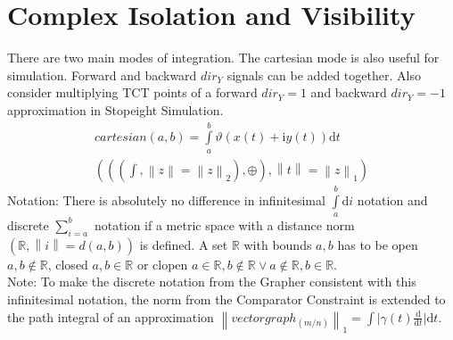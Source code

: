 \documentclass{report}
\newcommand\norm[1]{\left\lVert#1\right\rVert}
\begin{document}
\section{Complex Isolation and Visibility}
There are two main modes of integration. The cartesian mode is also useful for simulation. Forward and backward $dir_{Y}$ signals can be added together. Also consider multiplying TCT points of a forward $dir_{Y}=1$ and backward $dir_{Y}=-1$ approximation in Stopeight Simulation.
\begin{align}
cartesian(a,b)=\int \limits _{a}^{b} \vartheta (x(t)+\mathrm{i}y(t)) \mathrm{d} t\\
(((\int,\norm{z}=\norm{z}_2),\oplus),\norm{t}=\norm{z}_1)
\end{align}
Notation: There is absolutely no difference in infinitesimal $\int \limits _{a}^{b} \mathrm{d}i$ notation and discrete $\sum  \limits _{i=a}^{b}$ notation if a metric space with a distance norm $(\mathbb{R},\norm{i}=d(a,b))$ is defined. A set $\mathbb{R}$ with bounds $a,b$ has to be open $a,b \not \in \mathbb{R}$, closed $a,b \in \mathbb{R}$ or clopen $a \in \mathbb{R}, b \not \in \mathbb{R} \lor a \not \in \mathbb{R},b \in \mathbb{R}$.\\
Note: To make the discrete notation from the Grapher consistent with this infinitesimal notation, the norm from the Comparator Constraint is extended to the path integral of an approximation $\norm{vectorgraph_{(m/n)}}_1=\int \lvert \gamma (t) \frac{\mathrm{d}}{\mathrm{d}t} \rvert \mathrm{d}t$.
\end{document}

